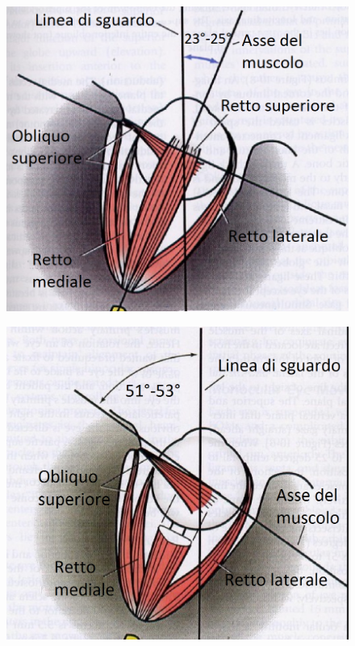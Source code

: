 \begin{figure}[h!]
\centering
\begin{minipage}{.5\textwidth}
  \centering
  \includegraphics[scale=0.34]{source/immagini/Assi_retti.png}
  \label{fig:test8}
\end{minipage}%
\begin{minipage}{.5\textwidth}
  \centering
  \includegraphics[scale=0.25]{source/immagini/Assi_obliqui.png}
  \label{fig:test9}
\end{minipage}
\end{figure} 


